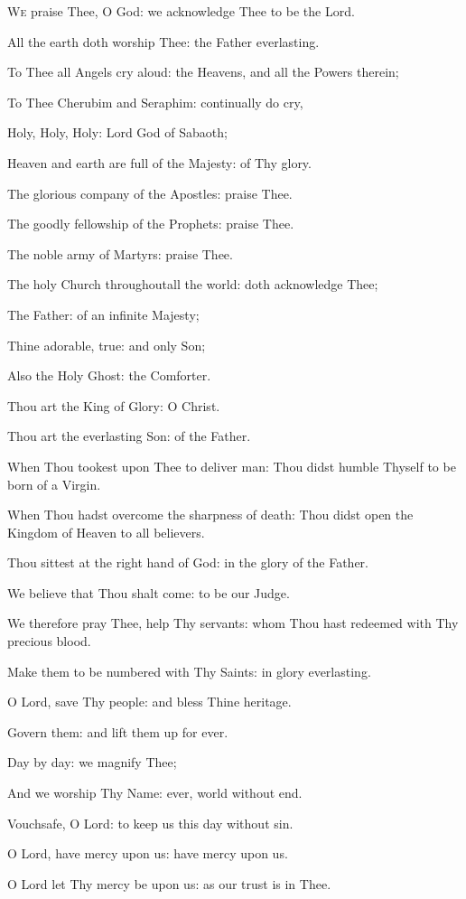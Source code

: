 \lettrine{W}{e} praise Thee, O God: we acknowledge Thee to be the Lord.

All the earth doth worship Thee: the Father everlasting.

To Thee all Angels cry aloud: the Heavens, and all the Powers therein;

To Thee Cherubim and Seraphim: continually do cry,

Holy, Holy, Holy: Lord God of Sabaoth;

Heaven and earth are full of the Majesty: of Thy glory.

The glorious company of the Apostles: praise Thee.

The goodly fellowship of the Prophets: praise Thee.

The noble army of Martyrs: praise Thee.

The holy Church throughoutall the world: doth acknowledge Thee;

The Father: of an infinite Majesty;

Thine adorable, true: and only Son;

Also the Holy Ghost: the Comforter.

Thou art the King of Glory: O Christ.

Thou art the everlasting Son: of the Father.

When Thou tookest upon Thee to deliver man: Thou didst humble Thyself to be born of a Virgin.

When Thou hadst overcome the sharpness of death: Thou didst open the Kingdom of Heaven to all believers.

Thou sittest at the right hand of God: in the glory of the Father.

We believe that Thou shalt come: to be our Judge.

We therefore pray Thee, help Thy servants: whom Thou hast redeemed with Thy precious blood.

Make them to be numbered with Thy Saints: in glory everlasting.

O Lord, save Thy people: and bless Thine heritage.

Govern them: and lift them up for ever.

Day by day: we magnify Thee;

And we worship Thy Name: ever, world without end.

Vouchsafe, O Lord: to keep us this day without sin.

O Lord, have mercy upon us: have mercy upon us.

O Lord let Thy mercy be upon us: as our trust is in Thee.

